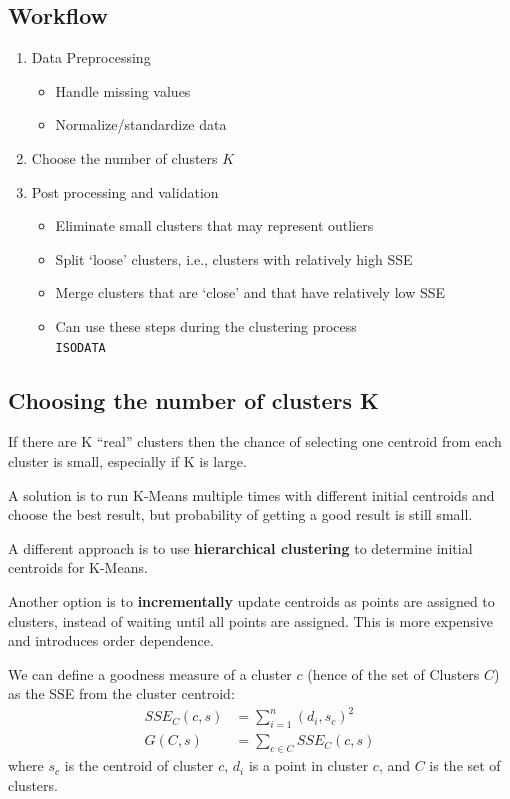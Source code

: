 \subsection{Workflow}
\begin{enumerate}
	\item Data Preprocessing
	      \begin{itemize}
		      \item Handle missing values
		      \item Normalize/standardize data
	      \end{itemize}
	\item Choose the number of clusters $K$
	\item Post processing and validation
	      \begin{itemize}
		      \item Eliminate small clusters that may represent outliers
		      \item Split ‘loose’ clusters, i.e., clusters with relatively high
		            SSE
		      \item Merge clusters that are ‘close’ and that have relatively
		            low SSE
		      \item Can use these steps during the clustering process\\
		            \texttt{ISODATA}
	      \end{itemize}
\end{enumerate}

\subsection{Choosing the number of clusters K}
If there are K ``real'' clusters then the chance of selecting
one centroid from each cluster is small, especially if K is large.

A solution is to run K-Means multiple times with different initial centroids and choose the best result, but probability of getting a good result is still small.

A different approach is to use \textbf{hierarchical clustering} to determine initial centroids for K-Means.

Another option is to \textbf{incrementally} update centroids as points are assigned to clusters, instead of waiting until all points are assigned.
This is more expensive and introduces order dependence.
\nl

We can define a goodness measure of a cluster $c$ (hence of the set of Clusters $C$) as the SSE from the cluster centroid:
\begin{align}
	SSE_C(c,s) &= \sum_{i=1}^{n} (d_i, s_c)^2\\
	G(C,s) &= \sum_{c \in C} SSE_C(c,s)
\end{align}
where $s_c$ is the centroid of cluster $c$, $d_i$ is a point in cluster $c$, and $C$ is the set of clusters.

